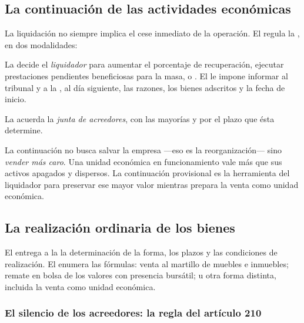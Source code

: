 \subsection{La continuación de las actividades económicas}

La liquidación no siempre implica el cese inmediato de la operación. El  regula la
, en dos modalidades:

\begin{description}[leftmargin=0pt,style=nextline,font=\sffamily\bfseries]
  \item[Provisional] La decide el \emph{liquidador} para aumentar el porcentaje de recuperación,
  ejecutar prestaciones pendientes beneficiosas para la masa, o . El  le impone informar al tribunal
  y a la \superir{}, al día siguiente, las razones, los bienes adscritos y la fecha de inicio.

  \item[Definitiva] La acuerda la \emph{junta de acreedores}, con las mayorías y por el plazo que
  ésta determine.
\end{description}

\begin{foco}
La continuación no busca salvar la empresa ---eso es la reorganización--- sino \emph{vender más
caro}. Una unidad económica en funcionamiento vale más que sus activos apagados y dispersos. La
continuación provisional es la herramienta del liquidador para preservar ese mayor valor
mientras prepara la venta como unidad económica.
\end{foco}

\subsection{La realización ordinaria de los bienes}

El  entrega a la  la determinación de la forma, los
plazos y las condiciones de realización. El  enumera las fórmulas: venta al martillo
de muebles e inmuebles; remate en bolsa de los valores con presencia bursátil; u otra forma
distinta, incluida la venta como unidad económica.

\subsubsection{El silencio de los acreedores: la regla del artículo 210}

